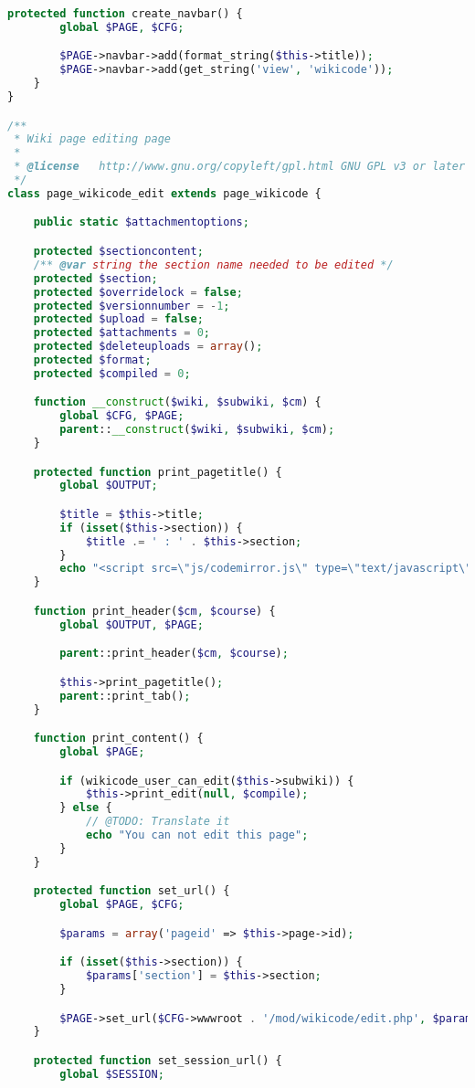\begin{lstlisting}[language=PHP]
    protected function create_navbar() {
        global $PAGE, $CFG;

        $PAGE->navbar->add(format_string($this->title));
        $PAGE->navbar->add(get_string('view', 'wikicode'));
    }
}

/**
 * Wiki page editing page
 *
 * @license   http://www.gnu.org/copyleft/gpl.html GNU GPL v3 or later
 */
class page_wikicode_edit extends page_wikicode {

    public static $attachmentoptions;

    protected $sectioncontent;
    /** @var string the section name needed to be edited */
    protected $section;
    protected $overridelock = false;
    protected $versionnumber = -1;
    protected $upload = false;
    protected $attachments = 0;
    protected $deleteuploads = array();
    protected $format;
	protected $compiled = 0;

    function __construct($wiki, $subwiki, $cm) {
        global $CFG, $PAGE;
        parent::__construct($wiki, $subwiki, $cm);
    }

    protected function print_pagetitle() {
        global $OUTPUT;

        $title = $this->title;
        if (isset($this->section)) {
            $title .= ' : ' . $this->section;
        }
		echo "<script src=\"js/codemirror.js\" type=\"text/javascript\"></script>";
    }

    function print_header($cm, $course) {
        global $OUTPUT, $PAGE;

        parent::print_header($cm, $course);

        $this->print_pagetitle();
		parent::print_tab();
    }

    function print_content() {
        global $PAGE;

        if (wikicode_user_can_edit($this->subwiki)) {
            $this->print_edit(null, $compile);
        } else {
            // @TODO: Translate it
            echo "You can not edit this page";
        }
    }

    protected function set_url() {
        global $PAGE, $CFG;

        $params = array('pageid' => $this->page->id);

        if (isset($this->section)) {
            $params['section'] = $this->section;
        }

        $PAGE->set_url($CFG->wwwroot . '/mod/wikicode/edit.php', $params);
    }

    protected function set_session_url() {
        global $SESSION;


\end{lstlisting}

